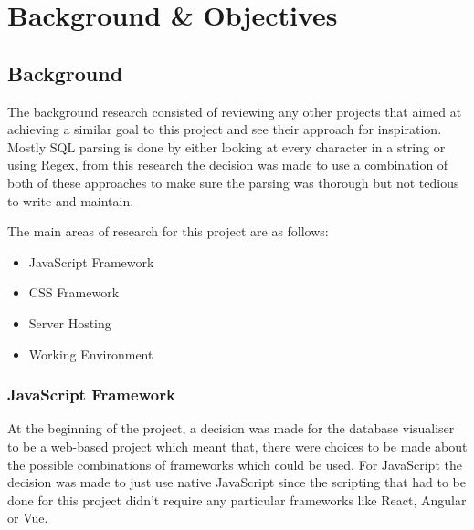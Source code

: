 \chapter{Background \& Objectives}

\section{Background}



The background research consisted of reviewing any other projects that aimed at achieving a similar goal to this project and see their approach for inspiration. Mostly SQL parsing is done by either looking at every character in a string or using Regex, from this research the decision was made to use a combination of both of these approaches to make sure the parsing was thorough but not tedious to write and maintain. 

The main areas of research for this project are as follows:

\begin{itemize}
	\item JavaScript Framework
	\item CSS Framework
	\item Server Hosting
	\item Working Environment
\end{itemize}

\subsection{JavaScript Framework}

At the beginning of the project, a decision was made for the database visualiser to be a web-based project which meant that, there were choices to be made about the possible combinations of frameworks which could be used. For JavaScript the decision was made to just use native JavaScript since the scripting that had to be done for this project didn't require any particular frameworks like React, Angular or Vue.

